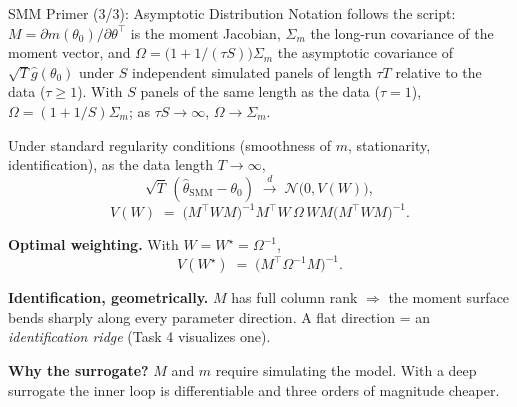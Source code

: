 \documentclass[10pt,aspectratio=169]{beamer}
\begin{document}
\begin{frame}{SMM Primer (3/3): Asymptotic Distribution}
\small
Notation follows the script: $M = \partial m(\theta_0)/\partial\theta^\top$ is the moment Jacobian, $\Sigma_m$ the long-run covariance of the moment vector, and $\Omega = \bigl(1 + 1/(\tau S)\bigr)\Sigma_m$ the asymptotic covariance of $\sqrt{T}\hat g(\theta_0)$ under $S$ independent simulated panels of length $\tau T$ relative to the data ($\tau \ge 1$).  With $S$ panels of the same length as the data ($\tau = 1$), $\Omega = (1+1/S)\Sigma_m$; as $\tau S \to \infty$, $\Omega \to \Sigma_m$.

\smallskip
Under standard regularity conditions (smoothness of $m$, stationarity, identification), as the data length $T\to\infty$,
\[
    \sqrt{T}\,(\widehat\theta_{\text{SMM}} - \theta_0)
    \;\xrightarrow{d}\; \mathcal{N}\bigl(0, V(W)\bigr),
\]
\[
    V(W) \;=\; \bigl(M^\top W M\bigr)^{-1} M^\top W \,\Omega\, W M \bigl(M^\top W M\bigr)^{-1}.
\]

\vspace{0.3em}
\textbf{Optimal weighting.} With $W = W^\star = \Omega^{-1}$,
\[
    V(W^\star) \;=\; \bigl(M^\top \Omega^{-1} M\bigr)^{-1}.
\]

\vspace{0.3em}
\textbf{Identification, geometrically.} $M$ has full column rank $\Rightarrow$ the moment surface bends sharply along every parameter direction. A flat direction = an \emph{identification ridge} (Task 4 visualizes one).

\vspace{0.3em}
\textbf{Why the surrogate?} $M$ and $m$ require simulating the model. With a deep surrogate the inner loop is differentiable and three orders of magnitude cheaper.
\end{frame}
\end{document}
